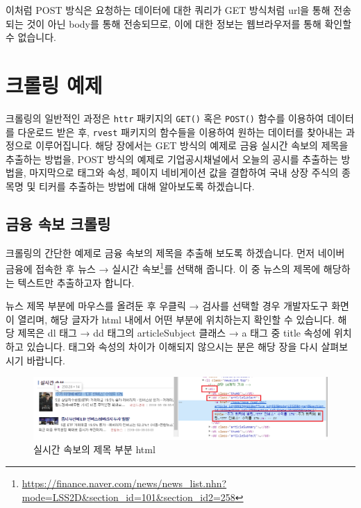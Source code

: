 \documentclass[12pt,]{book}
\let\rmarkdownfootnote\footnote%
\def\footnote{\protect\rmarkdownfootnote}
\begin{document}
이처럼 POST 방식은 요청하는 데이터에 대한 쿼리가 GET 방식처럼 url을 통해 전송되는 것이 아닌 body를 통해 전송되므로, 이에 대한 정보는 웹브라우저를 통해 확인할 수 없습니다.

\hypertarget{section-13}{%
\section{크롤링 예제}\label{section-13}}

크롤링의 일반적인 과정은 \texttt{httr} 패키지의 \texttt{GET()} 혹은 \texttt{POST()} 함수를 이용하여 데이터를 다운로드 받은 후, \texttt{rvest} 패키지의 함수들을 이용하여 원하는 데이터를 찾아내는 과정으로 이루어집니다. 해당 장에서는 GET 방식의 예제로 금융 실시간 속보의 제목을 추출하는 방법을, POST 방식의 예제로 기업공시채널에서 오늘의 공시를 추출하는 방법을, 마지막으로 태그와 속성, 페이지 네비게이션 값을 결합하여 국내 상장 주식의 종목명 및 티커를 추출하는 방법에 대해 알아보도록 하겠습니다.

\hypertarget{section-14}{%
\subsection{금융 속보 크롤링}\label{section-14}}

크롤링의 간단한 예제로 금융 속보의 제목을 추출해 보도록 하겠습니다. 먼저 네이버 금융에 접속한 후 뉴스 → 실시간 속보\footnote{\url{https://finance.naver.com/news/news_list.nhn?mode=LSS2D\&section_id=101\&section_id2=258}}를 선택해 줍니다. 이 중 뉴스의 제목에 해당하는 텍스트만 추출하고자 합니다.

뉴스 제목 부분에 마우스를 올려둔 후 우클릭 → 검사를 선택할 경우 개발자도구 화면이 열리며, 해당 글자가 html 내에서 어떤 부분에 위치하는지 확인할 수 있습니다. 해당 제목은 dl 태그 → dd 태그의 articleSubject 클래스 → a 태그 중 title 속성에 위치하고 있습니다. 태그와 속성의 차이가 이해되지 않으시는 분은 해당 장을 다시 살펴보시기 바랍니다.

\begin{figure}[h]

{\centering \includegraphics[width=1\linewidth]{images/crawl_naver_news} 

}

\caption{실시간 속보의 제목 부분 html}\label{fig:unnamed-chunk-8}
\end{figure}
\end{document}
